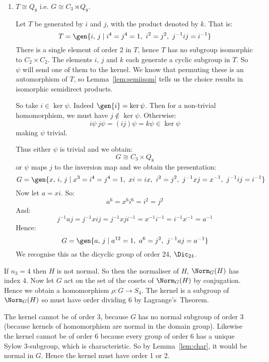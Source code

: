 \begin{enumerate}
    \item \(T \cong Q_8\) i.e. \(G \cong C_3 \rtimes Q_8\).

        Let \(T\) be generated by \(i\) and \(j\), with the product denoted by \(k\).
        That is:
        \[T = \gen{i,\,j \mid i^4 = j^4 = 1,\ i^2 = j^2,\ j^{-1}ij = i^{-1}}\]
        There is a single element of order 2 in \(T\), hence \(T\) has no subgroup isomorphic to \(C_2 \times C_2\).
        The elements \(i,\,j\) and \(k\) each generate a cyclic subgroup in \(T\).
        So \(\psi\) will send one of them to the kernel.
        We know that permuting these is an automorphism of \(T\), so Lemma~\ref{lem:semiisom} tells us the choice
        results in isomorphic semidirect products.

        So take \(i \in \ker{\psi}\).
        Indeed \(\gen{i} = \ker\psi\).
        Then for a non-trivial homomorphism, we must have \(j \notin \ker{\psi}\).
        Otherwise:
        \[i\psi\ j\psi = (ij)\psi = k\psi \in \ker{\psi}\]
        making \(\psi\) trivial.

        Thus either \(\psi\) is trivial and we obtain:
        \[G \cong C_3 \times Q_8\]
        or \(\psi\) maps \(j\) to the inversion map and we obtain the presentation:
        \[G = \gen{x,\,i,\,j \mid x^3 = i^4 = j^4 = 1,\ xi = ix,\ i^2 = j^2,\ j^{-1}xj = x^{-1},\ j^{-1}ij = i^{-1}}\]
        Now let \(a = xi\).
        So:
        \[a^6 = x^6 i^6 = i^2 = j^2\]
        And:
        \[j^{-1}aj = j^{-1}xij = j^{-1}xji^{-1} = x^{-1}i^{-1} = i^{-1}x^{-1} = a^{-1}\]
        Hence:
        \[G = \gen{a,\,j \mid a^{12} = 1,\ a^6 = j^2,\ j^{-1}aj = a^{-1}}\]
        We recognise this as the dicyclic group of order 24, \(\Dic_{24}\).

\end{enumerate}

If \(n_3 = 4\) then \(H\) is not normal.
So then the normaliser of \(H\), \(\Norm_G(H)\) has index 4.
Now let \(G\) act on the set of the cosets of \(\Norm_G(H)\) by conjugation.
Hence we obtain a homomorphism \(\rho:G \to S_4\).
The kernel is a subgroup of \(\Norm_G(H)\) so must have order dividing 6 by Lagrange's~Theorem.

The kernel cannot be of order 3, because \(G\) has no normal subgroup of order 3 (because kernels of homomorphism are
normal in the domain group).
Likewise the kernel cannot be of order 6 because every group of order 6 has a unique Sylow 3-subgroup, which is
characteristic.
So by Lemma~\ref{lem:char}, it would be normal in \(G\).
Hence the kernel must have order 1 or 2.

